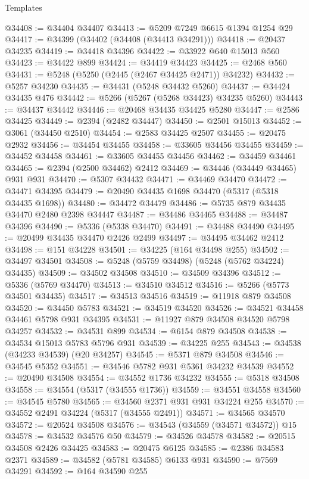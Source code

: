\begin{lexlean}{Templates}
\begin{coremodule}
@34408 := @34404 @34407
@34413 := @5209 @7249 @6615 @1394 @1254 @29
@34417 := @34399 (@34402 (@34408 (@34413 @34291)))
@34418 := @20437 @34235
@34419 := @34418 @34396
@34422 := @33922 @640 @15013 @560
@34423 := @34422 @899
@34424 := @34419 @34423
@34425 := @2468 @560
@34431 := @5248 (@5250 (@2445 (@2467 @34425 @2471)) @34232)
@34432 := @5257 @34230
@34435 := @34431 (@5248 @34432 @5260)
@34437 := @34424 @34435 @476
@34442 := @5266 (@5267 (@5268 @34423) @34235 @5260)
@34443 := @34437 @34442
@34446 := @20468 @34435 @34425 @5280
@34447 := @2586 @34425
@34449 := @2394 (@2482 @34447)
@34450 := @2501 @15013
@34452 := @3061 (@34450 @2510)
@34454 := @2583 @34425 @2507
@34455 := @20475 @2932
@34456 := @34454 @34455
@34458 := @33605 @34456 @34455
@34459 := @34452 @34458
@34461 := @33605 @34455 @34456
@34462 := @34459 @34461
@34465 := @2394 (@2500 @34462) @2412
@34469 := @34446 (@34449 @34465) @931 @931
@34470 := @5307 @34432
@34471 := @34469 @34470
@34472 := @34471 @34395
@34479 := @20490 @34435 @1698 @34470 (@5317 (@5318 @34435 @1698))
@34480 := @34472 @34479
@34486 := @5735 @879 @34435 @34470 @2480 @2398 @34447
@34487 := @34486 @34465
@34488 := @34487 @34396
@34490 := @5336 (@5338 @34470)
@34491 := @34488 @34490
@34495 := @20499 @34435 @34470 @2426 @2499
@34497 := @34495 @34462 @2412
@34498 := @151 @34228
@34501 := @34225 (@164 @34498 @255)
@34502 := @34497 @34501
@34508 := @5248 (@5759 @34498) (@5248 (@5762 @34224) @34435)
@34509 := @34502 @34508
@34510 := @34509 @34396
@34512 := @5336 (@5769 @34470)
@34513 := @34510 @34512
@34516 := @5266 (@5773 @34501 @34435)
@34517 := @34513 @34516
@34519 := @11918 @879 @34508
@34520 := @34450 @5783
@34521 := @34519 @34520
@34526 := @34521 @34458 @34461 @5798 @931 @34395
@34531 := @11927 @879 @34508 @34520 @5798 @34257
@34532 := @34531 @899
@34534 := @6154 @879 @34508
@34538 := @34534 @15013 @5783 @5796 @931
@34539 := @34225 @255
@34543 := @34538 (@34233 @34539) (@20 @34257)
@34545 := @5371 @879 @34508
@34546 := @34545 @5352
@34551 := @34546 @5782 @931 @5361 @34232 @34539
@34552 := @20490 @34508
@34554 := @34552 @1736 @34232
@34555 := @5318 @34508
@34558 := @34554 (@5317 (@34555 @1736))
@34559 := @34551 @34558
@34560 := @34545 @5780
@34565 := @34560 @2371 @931 @931 @34224 @255
@34570 := @34552 @2491 @34224 (@5317 (@34555 @2491))
@34571 := @34565 @34570
@34572 := @20524 @34508
@34576 := @34543 (@34559 (@34571 @34572)) @15
@34578 := @34532 @34576 @50
@34579 := @34526 @34578
@34582 := @20515 @34508 @2426 @34425
@34583 := @20475 @6125
@34585 := @2386 @34583 @2371
@34589 := @34582 (@5781 @34585) @6133 @931
@34590 := @7569 @34291
@34592 := @164 @34590 @255

\end{coremodule}
\end{lexlean}
